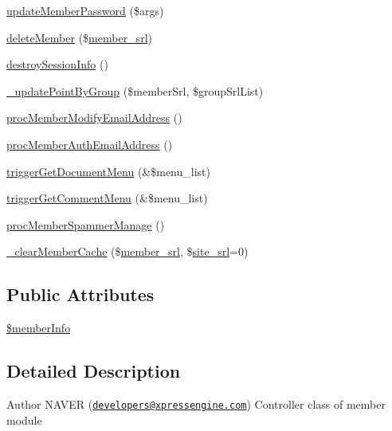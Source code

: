 \begin{DoxyCompactItemize}
\item 
\hyperlink{classmemberController_aed05d2a367f7e7a5b70fcbd0b4a08e74}{update\+Member\+Password} (\$args)
\item 
\hyperlink{classmemberController_a5170b3fafc449f4cc6fc599c093fcc06}{delete\+Member} (\$\hyperlink{ko_8install_8php_aa61f9e08f0fe505094d26f8143f30bbd}{member\+\_\+srl})
\item 
\hyperlink{classmemberController_ac259eb5e2f5ea0b7e747608fa1a308bd}{destroy\+Session\+Info} ()
\item 
\hyperlink{classmemberController_abe9b21621506198b75656781e6919dba}{\+\_\+update\+Point\+By\+Group} (\$member\+Srl, \$group\+Srl\+List)
\item 
\hyperlink{classmemberController_ac5954a875ecc954379437d5c7762fdfe}{proc\+Member\+Modify\+Email\+Address} ()
\item 
\hyperlink{classmemberController_a7584206ce0ce606173fade04207fb1ea}{proc\+Member\+Auth\+Email\+Address} ()
\item 
\hyperlink{classmemberController_a4f6ca6a2a8db362cac531920762a94f9}{trigger\+Get\+Document\+Menu} (\&\$menu\+\_\+list)
\item 
\hyperlink{classmemberController_aa97406ab4da679f7b54cceb404bd563f}{trigger\+Get\+Comment\+Menu} (\&\$menu\+\_\+list)
\item 
\hyperlink{classmemberController_a99f87aecac7ae283cec747a007df88b8}{proc\+Member\+Spammer\+Manage} ()
\item 
\hyperlink{classmemberController_a6b061f30aaaa5c4f1f8da1d52fdb2da9}{\+\_\+clear\+Member\+Cache} (\$\hyperlink{ko_8install_8php_aa61f9e08f0fe505094d26f8143f30bbd}{member\+\_\+srl}, \$\hyperlink{ko_8install_8php_a8b1406b4ad1048041558dce6bfe89004}{site\+\_\+srl}=0)
\end{DoxyCompactItemize}
\subsection*{Public Attributes}
\begin{DoxyCompactItemize}
\item 
\hyperlink{classmemberController_a01868bd628d8e1b39a4256352fccad44}{\$member\+Info}
\end{DoxyCompactItemize}


\subsection{Detailed Description}
\begin{DoxyAuthor}{Author}
N\+A\+V\+ER (\href{mailto:developers@xpressengine.com}{\tt developers@xpressengine.\+com}) Controller class of member module 
\end{DoxyAuthor}


